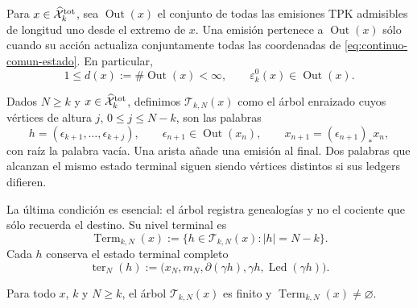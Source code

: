 Para \(x\in\widehat{\mathcal X}^{\rm tot}_k\), sea
\(\operatorname{Out}(x)\) el conjunto de todas las emisiones TPK admisibles
de longitud uno desde el extremo de \(x\).  Una emisión pertenece a
\(\operatorname{Out}(x)\) sólo cuando su acción actualiza conjuntamente todas
las coordenadas de \eqref{eq:continuo-comun-estado}.  En particular,
\begin{equation}
\label{eq:continuo-comun-out-finito}
 1\leq d(x):=\#\operatorname{Out}(x)<\infty,
 \qquad
 \varepsilon^0_k(x)\in\operatorname{Out}(x).
\end{equation}

\begin{definition}
\label{def:continuo-comun-arbol-finito}
Dados \(N\geq k\) y
\(x\in\widehat{\mathcal X}^{\rm tot}_k\), definimos
\(\mathscr T_{k,N}(x)\) como el árbol enraizado cuyos vértices de altura
\(j\), \(0\leq j\leq N-k\), son las palabras
\begin{equation}
\label{eq:continuo-comun-vertice-arbol}
 h=(\epsilon_{k+1},\ldots,\epsilon_{k+j}),
 \qquad
 \epsilon_{n+1}\in\operatorname{Out}(x_n),
 \qquad
 x_{n+1}=(\epsilon_{n+1})_*x_n,
\end{equation}
con raíz la palabra vacía.  Una arista añade una emisión al final.  Dos
palabras que alcanzan el mismo estado terminal siguen siendo vértices
distintos si sus ledgers difieren.
\end{definition}

La última condición es esencial: el árbol registra genealogías y no el
cociente que sólo recuerda el destino.  Su nivel terminal es
\begin{equation}
\label{eq:continuo-comun-terminal-finito}
 \operatorname{Term}_{k,N}(x)
 :=\{h\in\mathscr T_{k,N}(x):|h|=N-k\}.
\end{equation}
Cada \(h\) conserva el estado terminal completo
\begin{equation}
\label{eq:continuo-comun-registro-terminal}
 \operatorname{ter}_{N}(h)
 :=\bigl(x_N,m_N,\partial(\gamma h),
          \gamma h,\operatorname{Led}(\gamma h)\bigr).
\end{equation}

\begin{proposition}
\label{prop:continuo-comun-arbol-finito-no-vacio}
Para todo \(x\), \(k\) y \(N\geq k\), el árbol
\(\mathscr T_{k,N}(x)\) es finito y
\(\operatorname{Term}_{k,N}(x)\neq\varnothing\).
\end{proposition}

